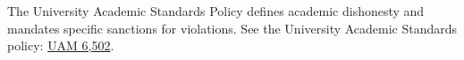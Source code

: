 The University Academic Standards Policy defines academic dishonesty and mandates
specific sanctions for violations. See the University Academic Standards policy:
\href{https://www.unr.edu/administrative-manual/6000-6999-courses-curricula-and-organizational-change-process/6502-academic-standards}{UAM 6,502}.
